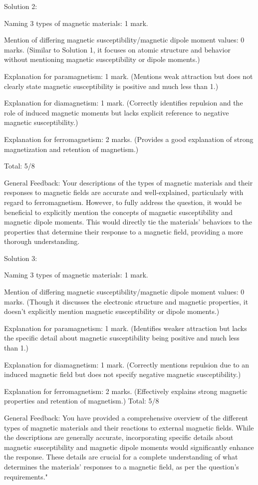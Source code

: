 \documentclass[a4paper,11pt]{article}
\begin{document}
Solution 2:

Naming 3 types of magnetic materials: 1 mark.

Mention of differing magnetic susceptibility/magnetic dipole moment values: 0 marks. (Similar to Solution 1, it focuses on atomic structure and behavior without mentioning magnetic susceptibility or dipole moments.)

Explanation for paramagnetism: 1 mark. (Mentions weak attraction but does not clearly state magnetic susceptibility is positive and much less than 1.)

Explanation for diamagnetism: 1 mark. (Correctly identifies repulsion and the role of induced magnetic moments but lacks explicit reference to negative magnetic susceptibility.)

Explanation for ferromagnetism: 2 marks. (Provides a good explanation of strong magnetization and retention of magnetism.)

Total: 5/8

General Feedback:
Your descriptions of the types of magnetic materials and their responses to magnetic fields are accurate and well-explained, particularly with regard to ferromagnetism. However, to fully address the question, it would be beneficial to explicitly mention the concepts of magnetic susceptibility and magnetic dipole moments. This would directly tie the materials' behaviors to the properties that determine their response to a magnetic field, providing a more thorough understanding.

Solution 3:

Naming 3 types of magnetic materials: 1 mark.

Mention of differing magnetic susceptibility/magnetic dipole moment values: 0 marks. (Though it discusses the electronic structure and magnetic properties, it doesn't explicitly mention magnetic susceptibility or dipole moments.)

Explanation for paramagnetism: 1 mark. (Identifies weaker attraction but lacks the specific detail about magnetic susceptibility being positive and much less than 1.)

Explanation for diamagnetism: 1 mark. (Correctly mentions repulsion due to an induced magnetic field but does not specify negative magnetic susceptibility.)

Explanation for ferromagnetism: 2 marks. (Effectively explains strong magnetic properties and retention of magnetism.)
Total: 5/8

General Feedback:
You have provided a comprehensive overview of the different types of magnetic materials and their reactions to external magnetic fields. While the descriptions are generally accurate, incorporating specific details about magnetic susceptibility and magnetic dipole moments would significantly enhance the response. These details are crucial for a complete understanding of what determines the materials' responses to a magnetic field, as per the question's requirements."
\end{document}
